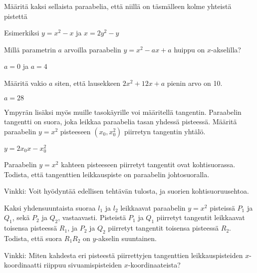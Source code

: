 \begin{tehtavasivu}
\begin{tehtava}
Määritä kaksi sellaista paraabelia, että niillä on täsmälleen kolme yhteistä pistettä
\begin{vastaus}
Esimerkiksi $y=x^2-x$ ja  $x=2y^2-y$
\end{vastaus}
\end{tehtava}

\begin{tehtava}
Millä parametrin $a$ arvoilla paraabelin $y=x^2-ax+a$ huippu on $x$-akselilla?
\begin{vastaus}
$a=0$ ja $a=4$
\end{vastaus}
\end{tehtava}

\begin{tehtava}
Määritä vakio $a$ siten, että lausekkeen $2x^2+12x+a$ pienin arvo on 10.
\begin{vastaus}
$a=28$
\end{vastaus}
\end{tehtava}

\begin{tehtava}
Ympyrän lisäksi myös muille tasokäyrille voi määritellä tangentin. Paraabelin tangentti on suora, joka leikkaa paraabelia tasan yhdessä pisteessä. Määritä paraabelin $y = x^2$ pisteeseen $(x_0, x_0^2)$ piirretyn tangentin yhtälö.
	\begin{vastaus}
		$y = 2x_0x-x_0^2$
	\end{vastaus}
\end{tehtava}

\begin{tehtava}
Paraabelin  $y = x^2$ kahteen pisteeseen piirretyt tangentit ovat kohtisuorassa. Todista, että tangenttien leikkauspiste on paraabelin johtosuoralla.
	\begin{vastaus}
		Vinkki: Voit hyödyntää edellisen tehtävän tulosta, ja suorien kohtisuoruusehtoa.
	\end{vastaus}
\end{tehtava}

\begin{tehtava}
Kaksi yhdensuuntaista suoraa $l_1$ ja $l_2$ leikkaavat paraabelin $y = x^2$ pisteissä $P_1$ ja $Q_1$, sekä $P_2$ ja $Q_2$, vastaavasti. Pisteistä $P_1$ ja $Q_1$ piirretyt tangentit leikkaavat toisensa pisteessä $R_1$, ja $P_2$ ja $Q_2$ piirretyt tangentit toisensa pisteessä $R_2$. Todista, että suora $R_1R_2$ on $y$-akselin suuntainen.
	\begin{vastaus}
		Vinkki: Miten kahdesta eri pisteestä piirrettyjen tangenttien leikkauspisteiden $x$-koordinaatti riippuu sivuamispisteiden $x$-koordinaateista?
	\end{vastaus}
\end{tehtava}


\end{tehtavasivu}
